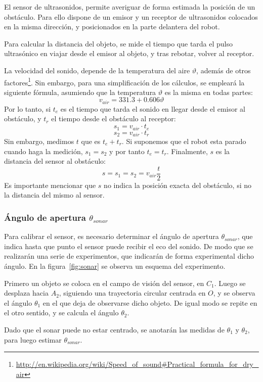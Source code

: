 \documentclass[10pt,a4paper,hidelinks]{article}
\begin{document}
\begin{multicols}{2}
El sensor de ultrasonidos, permite averiguar de forma estimada la posición de un obstáculo. Para ello dispone de un emisor y un receptor de ultrasonidos colocados en la misma dirección, y posicionados en la parte delantera del robot.

Para calcular la distancia del objeto, se mide el tiempo que tarda el pulso ultrasónico en viajar desde el emisor al objeto, y tras rebotar, volver al receptor.

La velocidad del sonido, depende de la temperatura del aire $\vartheta$, además
de otros
factores\footnote{\url{http://en.wikipedia.org/wiki/Speed\_of\_sound\#Practical\_formula\_for\_dry\_air}}.
Sin embargo, para una simplificación de los cálculos, se empleará la siguiente
fórmula, asumiendo que la temperatura $\vartheta$ es la misma en todas partes:
$$ v_{air} = 331.3 + 0.606\vartheta $$
Por lo tanto, si $t_e$ es el tiempo que tarda el sonido en llegar desde el emisor al obstáculo, y $t_r$ el tiempo desde el obstáculo al receptor:
$$ s_1 = v_{air} \cdot t_e $$
$$ s_2 = v_{air} \cdot t_r $$
Sin embargo, medimos $t$ que es $t_e+t_r$. Si suponemos que el robot esta parado cuando haga la medición, $s_1 = s_2$ y por tanto $t_e = t_r$. Finalmente, $s$ es la distancia del sensor al obstáculo:
\begin{equation}
	s = s_1 = s_2 = v_{air}\frac{t}{2}\label{eq:air}
\end{equation}
Es importante mencionar que $s$ no indica la posición exacta del obstáculo, si 
no la distancia del mismo al sensor.

\subsubsection{Ángulo de apertura $\theta_{sonar}$}
Para calibrar el sensor, es necesario determinar el ángulo de apertura 
$\theta_{sonar}$, que indica hasta que punto el sensor puede recibir el eco del 
sonido. De modo que se realizarán una serie de experimentos, que indicarán de 
forma experimental dicho ángulo. En la figura~\ref{fig:sonar} se observa un
esquema del experimento.

Primero un objeto se coloca en el campo de visión del sensor, en $C_1$. Luego se 
desplaza hacia $A_2$, siguiendo una trayectoria circular centrada en $O$, y se 
observa el ángulo $\theta_1$ en el que deja de observarse dicho objeto. De igual 
modo se repite en el otro sentido, y se calcula el ángulo $\theta_{2}$.

Dado que el sonar puede no estar centrado, se anotarán las medidas de $\theta_1$
y $\theta_2$, para luego estimar $\theta_{sonar}$.


\end{multicols}
\end{document}
